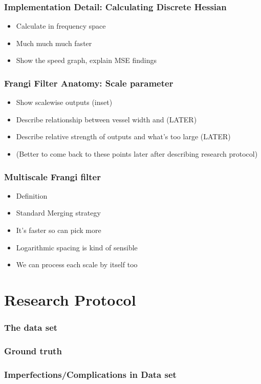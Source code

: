 \documentclass[9pt,notes]{beamer}
\begin{document}
\begin{frame}
\frametitle{Implementation Detail: Calculating Discrete Hessian}
\begin{itemize}
  \item Calculate in frequency space
  \item Much much much faster
  \item Show the speed graph, explain MSE findings
\end{itemize}
\end{frame}

\begin{frame}
\frametitle{Frangi Filter Anatomy: Scale parameter}
\begin{itemize}
  \item Show scalewise outputs (inset)
  \item Describe relationship between vessel width and (LATER)
  \item Describe relative strength of outputs and what's too large (LATER)
  \item (Better to come back to these points later after describing research protocol)
\end{itemize}
\end{frame}

\begin{frame}
\frametitle{Multiscale Frangi filter}
\begin{itemize}
  \item Definition
  \item Standard Merging strategy
  \item It's faster so can pick more
  \item Logarithmic spacing is kind of sensible
  \item We can process each scale by itself too
\end{itemize}
\end{frame}


\section{Research Protocol}
\begin{frame}
\frametitle{The data set}
\end{frame}

\begin{frame}
\frametitle{Ground truth}
\end{frame}

\begin{frame}
\frametitle{Imperfections/Complications in Data set}
\end{frame}
\end{document}
